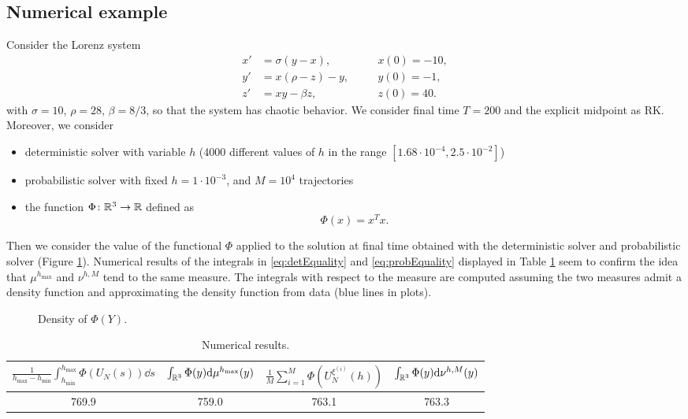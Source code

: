 \documentclass{scrartcl}
\begin{document}
\subsection*{Numerical example}

Consider the Lorenz system 
\begin{equation}\label{eq:Lorenz}
\begin{aligned}
x' &= \sigma(y - x), \quad &&x(0) = -10,\\
y' &= x(\rho - z) - y, \quad &&y(0) = -1,\\
z' &= xy - \beta z, \quad &&z(0) = 40.
\end{aligned}
\end{equation}
with $\sigma = 10$, $\rho = 28$, $\beta = 8/3$, so that the system has chaotic behavior. We consider final time $T = 200$ and the explicit midpoint as RK. Moreover, we consider
\begin{itemize}
	\item deterministic solver with variable $h$ (4000 different values of $h$ in the range $[1.68 \cdot 10^{-4}, 2.5 \cdot 10^{-2}]$)
	\item probabilistic solver with fixed $h = 1 \cdot 10^{-3}$, and $M = 10^4$ trajectories
	\item the function $\Phi\colon\mathbb{R}^3\to\mathbb{R}$ defined as $$\Phi(x) = x^Tx.$$ 
\end{itemize}
Then we consider the value of the functional $\Phi$ applied to the solution at final time obtained with the deterministic solver and probabilistic solver (Figure \ref{fig:densities}). Numerical results of the integrals in \eqref{eq:detEquality} and \eqref{eq:probEquality} displayed in Table \ref{tab:numResults} seem to confirm the idea that $\mu^{h_{\max}}$ and $\nu^{h,M}$ tend to the same measure. The integrals with respect to the measure are computed assuming the two measures admit a density function and approximating the density function from data (blue lines in plots).

\begin{figure}[t]
\begin{subfigure}{0.49\linewidth}
	\centering
	\resizebox{1.0\linewidth}{!}{}
\end{subfigure}
\begin{subfigure}{0.49\linewidth}
	\centering
	\resizebox{1.0\linewidth}{!}{}
\end{subfigure}
\caption{Density of $\Phi(Y)$.}
\label{fig:densities}
\end{figure}

\begin{table}[t]
	\centering
	\begin{tabular}{cccc}
		\toprule
		$\frac{1}{h_{\max} - h_{\min}} \int_{h_{\min}}^{h_{\max}} \Phi(U_N(s))\dd s$ & $\int_{\mathbb{R}^3} \Phi(y)\dd \mu^{h_{\max}}(y)$ & $\frac{1}{M} \sum_{i=1}^M \Phi(U_N^{\xi^{(i)}}(h))$ & $\int_{\mathbb{R}^3} \Phi(y)\dd \nu^{h,M}(y)$ \\ 
		\midrule
		769.9 & 759.0 & 763.1 & 763.3 \\
		\bottomrule
	\end{tabular}
	\caption{Numerical results.}
	\label{tab:numResults}
\end{table}
\end{document}
